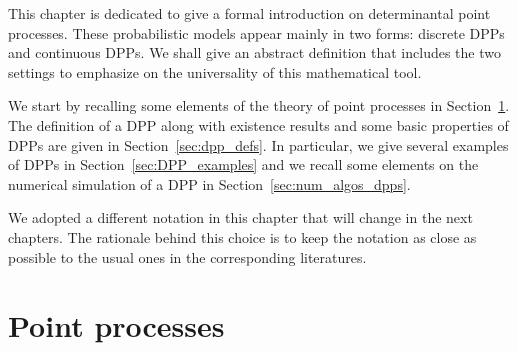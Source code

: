 \documentclass[twoside,11pt]{book}
\numberwithin{theorem}{chapter}
\numberwithin{definition}{chapter}
\numberwithin{proposition}{chapter}
\numberwithin{corollary}{chapter}
\numberwithin{example}{chapter}
\numberwithin{lemma}{chapter}
\numberwithin{assumption}{chapter}
\numberwithin{equation}{chapter}
\numberwithin{figure}{chapter}
\begin{document}



This chapter is dedicated to give a formal introduction on determinantal point processes. These probabilistic models appear mainly in two forms: discrete DPPs and continuous DPPs. We shall give an abstract definition that includes the two settings to emphasize on the universality of this mathematical tool.




We start by recalling some elements of the theory of point processes in Section~\ref{sec:pointprocesses}. The definition of a DPP along with existence results and some basic properties of DPPs are given in Section~\ref{sec:dpp_defs}. In particular, we give several examples of DPPs in Section~\ref{sec:DPP_examples} and we recall some elements on the numerical simulation of a DPP in Section~\ref{sec:num_algos_dpps}.

We adopted a different notation in this chapter that will change in the next chapters. The rationale behind this choice is to keep the notation as close as possible to the usual ones in the corresponding literatures.





\section{Point processes}\label{sec:pointprocesses}
\end{document}
